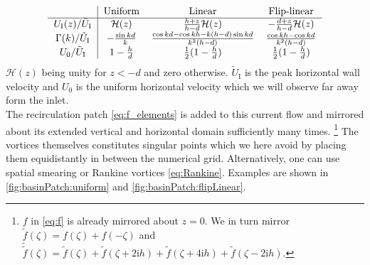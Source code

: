 \documentclass[a4paper,12pt]{article}
\newcommand{\mr}{\mathrm}
\newcommand{\mc}{\mathcal}
\newcommand{\ii}{\mr{i}}
\renewcommand{\_}[1]{_\mr{#1}}
\begin{document}
\begin{equation}
\begin{tabular}{c|ccc}
& Uniform & Linear & Flip-linear \\\hline
$U\_I(z)/\tilde U\_I$ & 
$\mc H(z) $&
$\frac{h+z}{h-d}\mc H(z)$&
$-\frac{d+z}{h-d}\mc H(z)$\\
$\Gamma(k)/\tilde U\_I$&
$-\frac{\sin kd}k$&
$\frac{\cos kd-\cos kh -k(h-d)\sin kd}{k^2(h-d)}$ &
$\frac{\cos kh-\cos kd }{k^2(h-d)}$\\
$U_0/\tilde U\_I$ &
$1-\frac hd$ &
$\frac12(1-\frac hd)$ &
$\frac12(1-\frac hd)$
\end{tabular}
\label{eq:Gammas}
\end{equation}
$\mc H(z)$ being unity for $z<-d$ and zero otherwise. $\tilde U\_I$ is the peak horizontal wall velocity and $U_0$ is the uniform horizontal velocity which we will observe far away form the inlet. 
\\

The recirculation patch \eqref{eq:f_elements} is added to this current flow and mirrored about its extended vertical and horizontal domain sufficiently many times.%
\footnote{$f$ in \eqref{eq:f} is already mirrored about $z=0$. We in turn mirror $\tilde f(\zeta)=f(\zeta)+f(-\zeta)$ and $\tilde{\tilde f}(\zeta)= \tilde f(\zeta) + \tilde f(\zeta+2\ii h)+ \tilde f(\zeta+4\ii h)+ \tilde f(\zeta-2\ii h)$.}
The vortices themselves constitutes singular points which we here avoid by placing them equidistantly in between the numerical grid. Alternatively, one can use spatial smearing or Rankine vortices \eqref{eq:Rankine}. 
Examples are shown in \autoref{fig:basinPatch:uniform} and \ref{fig:basinPatch:flipLinear}.
 
\end{document}
